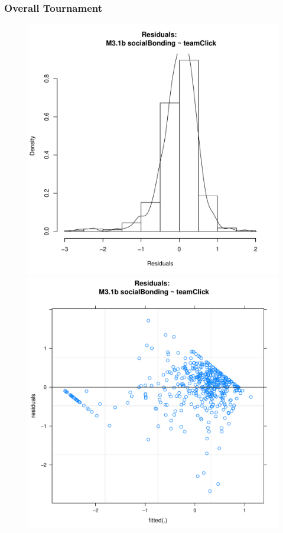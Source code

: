       \subsubsection{Overall Tournament\label{app8:MLM32a}}


        

        




            \begin{figure}[htbp]
              \includegraphics[scale =.4]{images/MLM31bHist.pdf}
              \includegraphics[scale =.4]{images/MLM31bScatter.pdf}

\end{figure}
